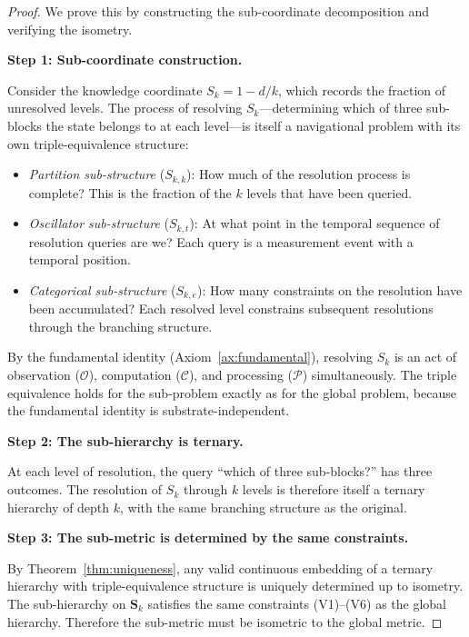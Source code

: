 \documentclass[12pt,twocolumn]{article}
\begin{document}
\begin{proof}
We prove this by constructing the sub-coordinate decomposition and verifying the isometry.

\textbf{Step 1: Sub-coordinate construction.}

Consider the knowledge coordinate $S_k = 1 - d/k$, which records the fraction of unresolved levels. The process of resolving $S_k$---determining which of three sub-blocks the state belongs to at each level---is itself a navigational problem with its own triple-equivalence structure:

\begin{itemize}
\item \emph{Partition sub-structure} ($S_{k,k}$): How much of the resolution process is complete? This is the fraction of the $k$ levels that have been queried.
\item \emph{Oscillator sub-structure} ($S_{k,t}$): At what point in the temporal sequence of resolution queries are we? Each query is a measurement event with a temporal position.
\item \emph{Categorical sub-structure} ($S_{k,e}$): How many constraints on the resolution have been accumulated? Each resolved level constrains subsequent resolutions through the branching structure.
\end{itemize}

By the fundamental identity (Axiom~\ref{ax:fundamental}), resolving $S_k$ is an act of observation ($\mathcal{O}$), computation ($\mathcal{C}$), and processing ($\mathcal{P}$) simultaneously. The triple equivalence holds for the sub-problem exactly as for the global problem, because the fundamental identity is substrate-independent.

\textbf{Step 2: The sub-hierarchy is ternary.}

At each level of resolution, the query ``which of three sub-blocks?'' has three outcomes. The resolution of $S_k$ through $k$ levels is therefore itself a ternary hierarchy of depth $k$, with the same branching structure as the original.

\textbf{Step 3: The sub-metric is determined by the same constraints.}

By Theorem~\ref{thm:uniqueness}, any valid continuous embedding of a ternary hierarchy with triple-equivalence structure is uniquely determined up to isometry. The sub-hierarchy on $\mathbf{S}_k$ satisfies the same constraints (V1)--(V6) as the global hierarchy. Therefore the sub-metric must be isometric to the global metric.


\end{proof}
\end{document}
